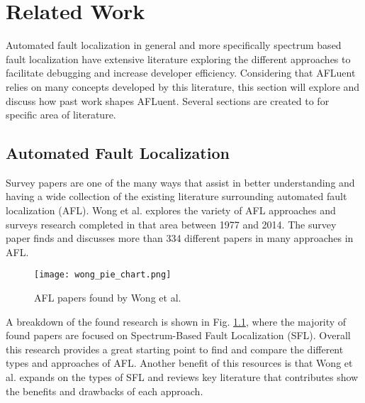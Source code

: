\chapter{Related Work} 
\label{ch:relatedwork}


Automated fault localization in general and more specifically spectrum based
fault localization have extensive literature exploring the different approaches
to facilitate debugging and increase developer efficiency. Considering that
AFLuent relies on many concepts developed by this literature, this section will
explore and discuss how past work shapes AFLuent. Several sections are created
to for specific area of literature.

\section{Automated Fault Localization}
\label{sec:AFLlit}

Survey papers are one of the many ways that assist in better
understanding and having a wide collection of the existing
literature surrounding automated fault localization (AFL).
Wong et al. \cite{wong2016survey} explores the variety of AFL approaches and
surveys research completed in that area between 1977 and 2014. The survey paper finds and
discusses more than 334 different papers in many approaches in AFL.
\begin{figure}[!htb]
	\begin{center}
		\texttt{[image: wong\_pie\_chart.png]}
		\caption{\label{fig:wong_breakdown} AFL papers found by Wong et al. \cite{wong2016survey}}
	\end{center}
\end{figure}

A breakdown of the found research is shown in Fig. \ref{fig:wong_breakdown}, where the
majority of found papers are focused on Spectrum-Based Fault Localization (SFL).
Overall this research provides a great
starting point to find and compare the different types and approaches of AFL.
Another benefit of this resources is that
Wong et al. \cite{wong2016survey} expands on the types of SFL
and reviews key literature that contributes show the benefits and drawbacks of
each approach.

